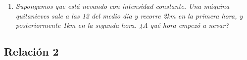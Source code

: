 \documentclass{article}
\begin{document}
\begin{enumerate}
\begin{itemize}
        \item \textit{El grafo de $x(t)$ verifica que la recta normal en cada punto pasa por el origen de coordenadas.}

        \vspace{7px}

        \textsc{Solución:} Siendo este apartado un caso particular del anterior no entiendo por qué aparece después. En fin, la mayor dificultad reside en saberse la ecuación de la recta normal.
        No obstante, asumimos que el receptor está familiarizado con dicha fórmula, de manera que las cuentas se simplifican mucho, quedándose la siguiente EDO como resultado final\footnote{Trabaja un poco, no te voy a hacer todo.}

        \[x(t)x'(t)=-t.\]

        $\hfill\square$
    \end{itemize}

    \vspace{12px}

    \item \textit{Supongamos que está nevando con intensidad constante. Una máquina quitanieves sale a las 12 del medio día y recorre 2km en la primera hora, y posteriormente 1km en la segunda hora. ¿A qué hora empezó a nevar?}
\end{enumerate}

\newpage

\subsection{Relación 2}
\end{document}

